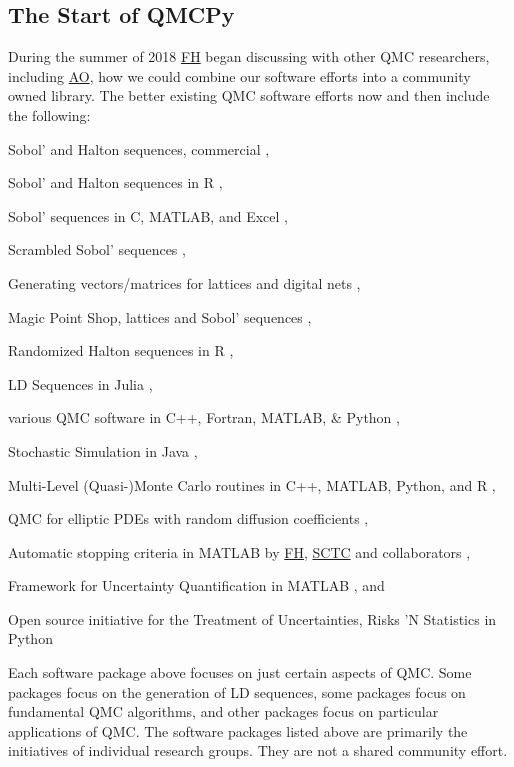 \documentclass[11pt]{NSFamsart}
\newcommand{\FH}{\hyperlink{FHlink}{FH}\xspace}
\newcommand{\SCTC}{\hyperlink{SCTClink}{SCTC}\xspace}
\newcommand{\AO}{\hyperlink{AOlink}{AO}\xspace}
\begin{document}
\subsection{The Start of QMCPy}
During the summer of 2018 \FH began discussing with other QMC researchers, including \AO, how we could combine our software efforts into a community owned library.  The better existing QMC software efforts now and then include the following:
\begin{description}[format=\textup]
	\item[MATLAB] Sobol' and Halton sequences, commercial \cite{MAT9.8},
	\item [qrng]  Sobol' and Halton sequences in R \cite{QRNG2020},
	\item[BRODA] Sobol' sequences in C, MATLAB, and Excel \cite{BRODA20a},
	\item[PyTorch] Scrambled Sobol' sequences \cite{PyTorch},
	\item[LatNet Builder] Generating vectors/matrices for lattices and digital nets \cite{LatNet},
	\item[MPS] Magic Point Shop, lattices and Sobol' sequences \cite{Nuy17a},
	\item[Owen] Randomized Halton sequences in R \cite{Owe20a},
	\item[Robbe] LD Sequences in Julia \cite{Rob20a},
	\item[Burkhardt] various QMC software in C++, Fortran, MATLAB, \& Python \cite{Bur20a},
	\item[SSJ] Stochastic Simulation in Java \cite{SSJ},
	\item[ML(Q)MC] Multi-Level (Quasi-)Monte Carlo routines in C++, MATLAB, Python, and R \cite{GilesSoft},
	\item[QMC4PDE] QMC for elliptic PDEs with random diffusion coefficients \cite{KuoNuy16a},
	\item[GAIL] Automatic stopping criteria in MATLAB by \FH, \SCTC and collaborators \cite{ChoEtal20a},
	\item[UQLab] Framework for Uncertainty Quantification in MATLAB \cite{UQLab2014}, and
	\item[OpenTURNS] Open source initiative for the Treatment of Uncertainties, Risks 'N Statistics in Python \cite{OpenTURNS}
\end{description}
Each software package above  focuses on just certain aspects of QMC.  Some packages focus on the generation of LD sequences, some packages focus on fundamental QMC algorithms, and other packages focus on particular applications of QMC.  The software packages listed above are primarily the initiatives of individual research groups.  They are not a shared community effort.
\end{document}
